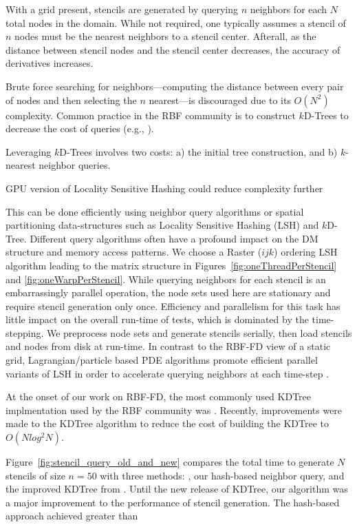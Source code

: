 \documentclass{report}
\begin{document}
With a grid present, stencils are generated by querying $n$ neighbors for each $N$ total nodes in the domain. While not required, one typically assumes a stencil of $n$ nodes must be the nearest neighbors to a stencil center. Afterall, as the distance between stencil nodes and the stencil center decreases, the accuracy of derivatives increases. 

Brute force searching for neighbors---computing the distance between every pair of nodes and then selecting the $n$ nearest---is discouraged due to its $O(N^2)$ complexity. Common practice in the RBF community is to construct $k$D-Trees to decrease the cost of queries (e.g., \cite{Fasshauer2007, FlyerLehto11, FornbergLehto11}). 



Leveraging $k$D-Trees involves two costs: a) the initial tree construction, and b) $k$-nearest neighbor queries. 

GPU version of Locality Sensitive Hashing could reduce complexity further \cite{Pan2011}

This can be done efficiently using neighbor query algorithms or spatial partitioning data-structures such as Locality Sensitive Hashing (LSH) and $k$D-Tree. Different query algorithms often have a profound impact on the DM structure and memory access patterns. We choose a Raster ($ijk$) ordering LSH algorithm \cite{Bollig2011} leading to the matrix structure in Figures~\ref{fig:oneThreadPerStencil} and \ref{fig:oneWarpPerStencil}. While querying neighbors for each stencil is an embarrassingly parallel operation, the node sets used here are stationary and require stencil generation only once. Efficiency and parallelism for this task has little impact on the overall run-time of tests, which is dominated by the time-stepping. We preprocess node sets and generate stencils serially, then load stencils and nodes from disk at run-time. In contrast to the RBF-FD view of a static grid, Lagrangian/particle based PDE algorithms promote efficient parallel variants of LSH in order to accelerate querying neighbors at each time-step \cite{Pan2011, Goswami2010}. 


At the onset of our work on RBF-FD, the most commonly used KDTree implmentation used by the RBF community was \cite{Tagliasacchi2008}. Recently, improvements were made to the KDTree algorithm to reduce the cost of building the KDTree to $O(N log^2 N)$. 

Figure~\ref{fig:stencil_query_old_and_new} compares the total time to generate $N$ stencils of size $n=50$ with three methods: \cite{Tagliasacchi2008}, our hash-based neighbor query, and the improved KDTree from \cite{Tagliasacchi2012}. 
Until the new release of KDTree, our algorithm was a major improvement to the performance of stencil generation. The hash-based approach achieved greater than 
\end{document}
